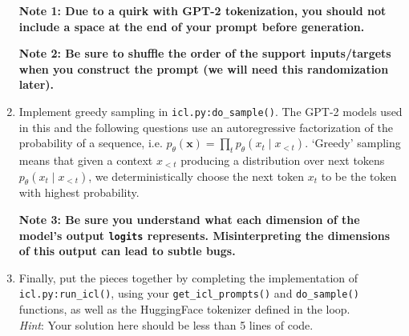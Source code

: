 \begin{enumerate}[label=(\roman*)]
    \textbf{Note 1: Due to a quirk with GPT-2 tokenization, you should not include a space at the end of your prompt before generation.}
    
    \textbf{Note 2: Be sure to shuffle the order of the support inputs/targets when you construct the prompt (we will need this randomization later).}
    \item Implement greedy sampling in \texttt{icl.py:do\_sample()}. The GPT-2 models used in this and the following questions use an autoregressive factorization of the probability of a sequence, i.e. $p_\theta(\mathbf{x}) = \prod_t p_\theta(x_t \mid x_{<t})$. `Greedy' sampling means that given a context $x_{<t}$ producing a distribution over next tokens $p_\theta(x_t \mid x_{<t})$, we deterministically choose the next token $x_t$ to be the token with highest probability.
    
    \textbf{Note 3: Be sure you understand what each dimension of the model's output \texttt{logits} represents. Misinterpreting the dimensions of this output can lead to subtle bugs.}
    
    \item Finally, put the pieces together by completing the implementation of \texttt{icl.py:\allowbreak run\_icl()}, using your \texttt{get\_icl\_prompts()} and \texttt{do\_sample()} functions, as well as the HuggingFace tokenizer defined in the loop. \\ \emph{Hint}: Your solution here should be less than 5 lines of code.
\end{enumerate}